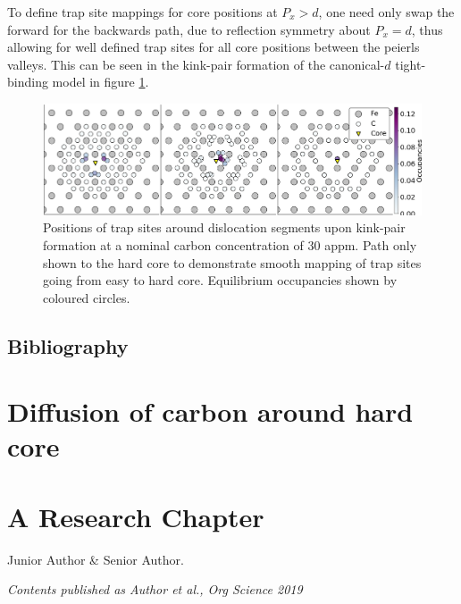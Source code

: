 \documentclass[a4paper,11pt]{article}
\numberwithin{equation}{chapter}
\numberwithin{listing}{chapter}
\begin{document}
To define trap site mappings for core positions at \(P_x > d\), one need only
swap the forward for the backwards path, due to reflection symmetry about
\(P_x = d\), thus allowing for well defined trap sites for all core positions
between the peierls valleys. This can be seen in the kink-pair formation of
the canonical-\(d\) tight-binding model in figure \ref{fig:kpoccupancies}.

\begin{figure}[htbp]
\centering
\includegraphics[width=1.\textwidth]{iron/Images/mclean_position_movement_occupancy_forward_alternate.png}
\caption{Positions of trap sites around dislocation segments upon kink-pair formation at a nominal carbon concentration of 30 appm. Path only shown to the hard core to demonstrate smooth mapping of trap sites going from easy to hard core. Equilibrium occupancies shown by coloured circles. \label{fig:kpoccupancies}}
\end{figure}

\subsection{Bibliography}
\label{sec:org525c467}
\label{org29218d5}







\section{Diffusion of carbon around hard core}
\label{sec:org59bd8d6}



\section[Research Chapter]{A Research Chapter}
\label{sec:org0e858d8}
\bigskip{\centering\color{BrickRed}\FourStar\par}\bigskip
\noindent
\begin{small}
Junior Author \& Senior Author.
\end{small}
\vspace*{\fill}
\begin{flushright}
\emph{Contents published as Author et al., Org Science 2019}
\end{flushright}
\clearpage
\end{document}
